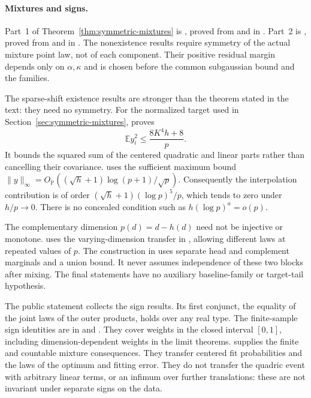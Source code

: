 \documentclass[11pt]{article}
\newcommand{\Pbb}{\mathbb P}
\newcommand{\E}{\mathbb E}
\newcommand{\norm}[1]{\lVert#1\rVert}
\newcommand{\OP}{O_{\Pbb}}
\theoremstyle{remark}
\begin{document}
\paragraph{Mixtures and signs.}
Part~1 of Theorem~\ref{thm:symmetric-mixtures} is
, proved from
 and 
in . Part~2 is
, proved from
 and 
in . The nonexistence results require symmetry of
the actual mixture point law, not of each component. Their positive
residual margin depends only on $\alpha,\kappa$ and is chosen before
the common subgaussian bound and the families.

The sparse-shift existence results are stronger than the theorem stated
in the text: they need no symmetry. For the normalized target used in
Section~\ref{sec:symmetric-mixtures},  proves
\[
 \E y_i^2\le \frac{8K^4h+8}{p}.
\]
It bounds the squared sum of the centered quadratic and linear parts
rather than cancelling their covariance. 
uses the sufficient maximum bound
$\norm y_\infty=\OP((\sqrt h+1)\log(p+1)/\sqrt p)$.
Consequently the interpolation contribution is of order
$(\sqrt h+1)(\log p)^5/p$, which tends to zero under $h/p\to0$.
There is no concealed condition such as $h(\log p)^a=o(p)$.

The complementary dimension $p(d)=d-h(d)$ need not be injective or
monotone.  uses the varying-dimension transfer in
, allowing different laws
at repeated values of $p$. The construction in 
uses separate head and complement marginals and a union bound. It never
assumes independence of these two blocks after mixing. The final
statements have no auxiliary baseline-family or target-tail hypothesis.

The public statement  collects the sign
results. Its first conjunct, the equality of the joint laws of the outer
products, holds over any real type. The finite-sample sign identities
are in  and
. They cover weights in the
closed interval $[0,1]$, including dimension-dependent weights in the
limit theorems.  supplies the finite and countable
mixture consequences. They transfer centered fit probabilities and the
laws of the optimum and fitting error. They do not transfer the quadric
event with arbitrary linear terms, or an infimum over further
translations: these are not invariant under separate signs on the data.
\end{document}
